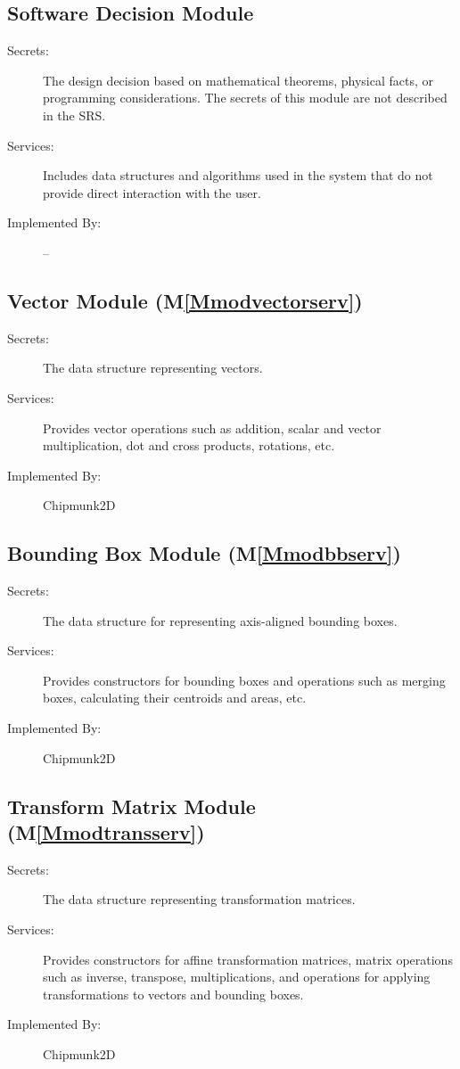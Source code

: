 \documentclass[12pt]{article}
\begin{document}
\subsection{Software Decision Module}
\label{Sec:SoftDeciModu}
\begin{description}
\item[Secrets:]The design decision based on mathematical theorems, physical facts, or programming considerations. The secrets of this module are not described in the SRS.
\item[Services:]Includes data structures and algorithms used in the system that do not provide direct interaction with the user.
\item[Implemented By:]--
\end{description}
\subsection{Vector Module (M\ref{Mmodvectorserv})}
\label{Sec:VectModu()}
\begin{description}
\item[Secrets:]The data structure representing vectors.
\item[Services:]Provides vector operations such as addition, scalar and vector multiplication, dot and cross products, rotations, etc.
\item[Implemented By:]Chipmunk2D
\end{description}
\subsection{Bounding Box Module (M\ref{Mmodbbserv})}
\label{Sec:BounBoxModu()}
\begin{description}
\item[Secrets:]The data structure for representing axis-aligned bounding boxes.
\item[Services:]Provides constructors for bounding boxes and operations such as merging boxes, calculating their centroids and areas, etc.
\item[Implemented By:]Chipmunk2D
\end{description}
\subsection{Transform Matrix Module (M\ref{Mmodtransserv})}
\label{Sec:TranMatrModu()}
\begin{description}
\item[Secrets:]The data structure representing transformation matrices.
\item[Services:]Provides constructors for affine transformation matrices, matrix operations such as inverse, transpose, multiplications, and operations for applying transformations to vectors and bounding boxes.
\item[Implemented By:]Chipmunk2D
\end{description}
\end{document}

